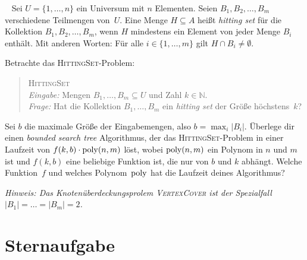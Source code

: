 \documentclass{uebung_cs}
\begin{document}
\begin{aufgabe}\
	Sei $U = \{1,\dots,n\}$ ein Universum mit $n$ Elementen.
	Seien $B_1,B_2,\dots,B_m$ verschiedene Teilmengen von~$U$.
	Eine Menge $H \subseteq A$ heißt \emph{hitting set} für die Kollektion $B_1,B_2,\dots,B_m$, wenn $H$ mindestens ein Element von jeder Menge $B_i$ enthält. Mit anderen Worten: Für alle $i \in \{1,\dots,m\}$ gilt $H \cap B_i \neq \emptyset$.

	Betrachte das \textsc{HittingSet}-Problem:
	\begin{quote}
		\textsc{HittingSet}\\
		\emph{Eingabe:} Mengen $B_1,\dots,B_m\subseteq U$ und Zahl $k\in \mathbb N$.\\
		\emph{Frage:} Hat die Kollektion $B_1,\dots,B_m$ ein \textit{hitting set} der Größe höchstens~$k$?
	\end{quote}

	Sei $b$ die maximale Größe der Eingabemengen, also $b=\max_i|B_i|$.
	Überlege dir einen \textit{bounded search tree} Algorithmus, der das \textsc{HittingSet}-Problem in einer Laufzeit von $f(k,b) \cdot \operatorname{poly}(n,m)$ löst, wobei $\operatorname{poly}(n,m)$ ein Polynom in $n$ und $m$ ist und $f(k,b)$ eine beliebige Funktion ist, die nur von $b$ und $k$ abhängt.
	Welche Funktion~$f$ und welches Polynom~$\operatorname{poly}$ hat die Laufzeit deines Algorithmus?

	\textit{Hinweis: Das Knotenüberdeckungsprolem \textsc{\upshape VertexCover} ist der Spezialfall $|B_1|=\dots=|B_m|=2$.}
\end{aufgabe}

\section*{Sternaufgabe}
\end{document}
